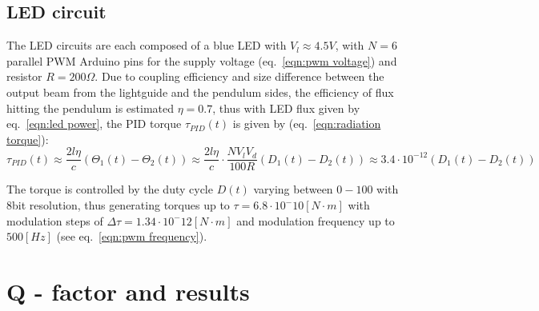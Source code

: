 \documentclass[\main/master.tex]{subfiles}
\begin{document}
\subsection{LED circuit}
The LED circuits are each composed of a blue LED with $V_l\approx 4.5V$, with $N=6$ parallel PWM Arduino pins for the supply voltage (eq.~\ref{eqn:pwm voltage}) and resistor $R = 200\Omega$. Due to coupling efficiency and size difference between the output beam from the lightguide and the pendulum sides, the efficiency of flux hitting the pendulum is estimated $\eta = 0.7$, thus with LED flux given by eq.~\ref{eqn:led power}, the PID torque $\tau_{PID}(t)$ is given by (eq.~\ref{eqn:radiation torque}):
\begin{equation}
\tau_{PID}(t) \approx \frac{2l\eta}{{c}} (\Theta_1(t) -\Theta_2(t)) \approx \frac{2l\eta}{{c}} \cdot\frac{N V_l V_d}{100R}(D_1(t) -D_2(t))  \approx   3.4\cdot 10^{-12}(D_1(t) -D_2(t)) 
\label{eqn:led torque}
\end{equation}
\par\noindent
The torque is controlled by the duty cycle $D(t)$ varying between $0-100$ with 8bit resolution, thus generating torques up to $\tau = 6.8\cdot10^-{10} [N\cdot m]$ with modulation steps of $\Delta\tau = 1.34\cdot10^-{12} [N\cdot m]$ and modulation frequency up to $500[Hz]$ (see eq.~\ref{eqn:pwm frequency}).
\section{Q - factor and results}
\end{document}
